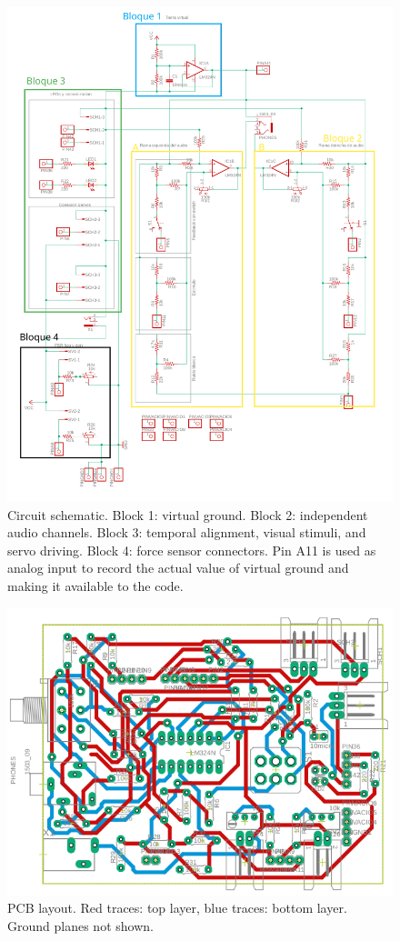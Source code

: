 \documentclass[twocolumn]{article}
\begin{document}
\begin{figure}[!ht]
    \centering
    \includegraphics[width=0.8\linewidth]{figures/schematic.pdf}
    \caption{Circuit schematic. Block 1: virtual ground. Block 2: independent audio channels. Block 3: temporal alignment, visual stimuli, and servo driving. Block 4: force sensor connectors. Pin A11 is used as analog input to record the actual value of virtual ground and making it available to the code.}
    \label{fig.schematic}
\end{figure}



\begin{figure}[!ht]
    \centering
    \includegraphics[width=0.7\linewidth]{figures/Circuito Tappingduino 3 Final - BRD ConexionCorrectaPower - CROP.png}
    \caption{PCB layout. Red traces: top layer, blue traces: bottom layer. Ground planes not shown.}
    \label{fig.BRDCompleto}
\end{figure}
\end{document}
